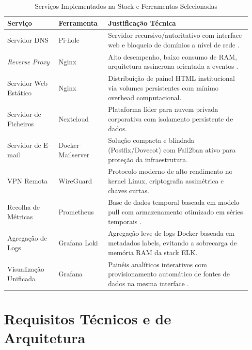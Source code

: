 \begin{table}[h!]
\centering
\caption{Serviços Implementados na Stack e Ferramentas Selecionadas}
\label{tab:servicos_completa}
\begin{tabulary}{\textwidth}{|L|L|L|}
\hline
\textbf{Serviço} & \textbf{Ferramenta} & \textbf{Justificação Técnica} \\
\hline
Servidor DNS & Pi-hole & Servidor recursivo/autoritativo com interface web e bloqueio de domínios a nível de rede \cite{pihole_docs}. \\
\hline
\textit{Reverse Proxy} & Nginx & Alto desempenho, baixo consumo de RAM, arquitetura assíncrona orientada a eventos \cite{nginx_docs}. \\
\hline
Servidor Web Estático & Nginx & Distribuição de painel HTML institucional via volumes persistentes com mínimo overhead computacional. \\
\hline
Servidor de Ficheiros & Nextcloud & Plataforma líder para nuvem privada corporativa com isolamento persistente de dados. \\
\hline
Servidor de E-mail & Docker-Mailserver & Solução compacta e blindada (Postfix/Dovecot) com Fail2ban ativo para proteção da infraestrutura. \\
\hline
VPN Remota & WireGuard & Protocolo moderno de alto rendimento no kernel Linux, criptografia assimétrica e chaves curtas. \\
\hline
Recolha de Métricas & Prometheus & Base de dados temporal baseada em modelo pull com armazenamento otimizado em séries temporais \cite{prometheus_docs}. \\
\hline
Agregação de Logs & Grafana Loki & Agregação leve de logs Docker baseada em metadados labels, evitando a sobrecarga de memória RAM da stack ELK. \\
\hline
Visualização Unificada & Grafana & Painéis analíticos interativos com provisionamento automático de fontes de dados na mesma interface \cite{grafana_docs}. \\
\hline
\end{tabulary}
\end{table}

\section{Requisitos Técnicos e de Arquitetura}

